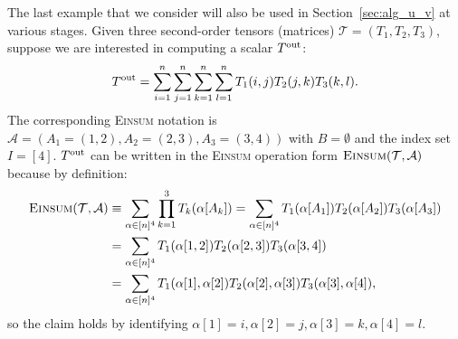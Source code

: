 \documentclass[twoside,11pt]{article}
\def\Einsum{\textsc{Einsum}}
\newcommand{\tensorcontraction}{\textsc{Einsum}}
\def\calA{\mathcal{A}}
\def\calT{\mathcal{T}}
\begin{document}
\begin{example}
\label{eg:running}
The last example that we consider will also be used in Section~\ref{sec:alg_u_v} at various stages. Given three second-order tensors (matrices) $\calT = (T_1, T_2, T_3)$, suppose we are interested in computing a scalar $T^{\rm out}$:
\begin{align*}
T^{\rm out} = \sum_{i = 1}^{n} \sum_{j = 1}^{n} \sum_{k = 1}^{n} \sum_{l = 1}^{n} T_1 (i, j) T_2 (j, k) T_3 (k, l).
\end{align*}
The corresponding \Einsum{} notation is $\calA = (A_1 = (1, 2), A_2 = (2, 3), A_3 = (3, 4))$ with $B = \emptyset$ and the index set $I = [4]$. $T^{\rm out}$ can be written in the \Einsum{} operation form $\tensorcontraction(\calT, \calA)$ because by definition:
\begin{align*}
\tensorcontraction(\calT, \calA) & \equiv \sum_{\alpha \in [n]^{4}} \prod_{k = 1}^{3} T_{k} (\alpha [A_k]) = \sum_{\alpha \in [n]^{4}} T_1 (\alpha [A_1]) T_2 (\alpha [A_2]) T_3 (\alpha [A_3]) \\
& = \sum_{\alpha \in [n]^{4}} T_1 (\alpha[1, 2]) T_2 (\alpha[2, 3]) T_3 (\alpha[3, 4]) \\
& = \sum_{\alpha \in [n]^{4}} T_1 (\alpha[1], \alpha[2]) T_2 (\alpha[2], \alpha[3]) T_3 (\alpha[3], \alpha[4]),
\end{align*}
so the claim holds by identifying $\alpha [1] = i, \alpha [2] = j, \alpha [3] = k, \alpha [4] = l$.
\end{example}
\end{document}
